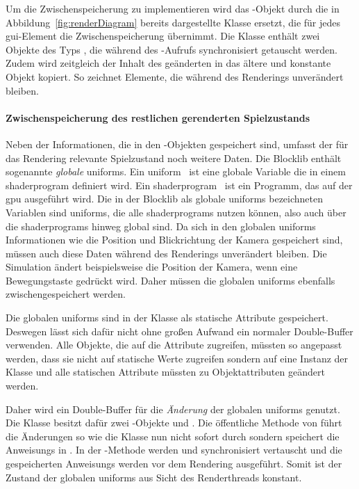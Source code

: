 Um die Zwischenspeicherung zu implementieren wird das -Objekt durch die in Abbildung~\vref{fig:renderDiagram} bereits dargestellte Klasse  ersetzt, die für jedes \ac{gui}-Element die Zwischenspeicherung übernimmt. Die Klasse enthält zwei Objekte des Typs , die während des -Aufrufs synchronisiert getauscht werden. Zudem wird zeitgleich der Inhalt des geänderten  in das ältere und konstante Objekt kopiert. So zeichnet  Elemente, die während des Renderings unverändert bleiben.


\paragraph{Zwischenspeicherung des restlichen gerenderten Spielzustands} Neben der Informationen, die in den  -Objekten gespeichert sind, umfasst der für das Rendering relevante Spielzustand noch weitere Daten. 
Die Blocklib enthält sogenannte \emph{globale} \glspl{uniform}. Ein \gls{uniform}~\cite[S.~45~ff.]{Vries2020} ist eine globale Variable die in einem \gls{shaderprogram} definiert wird. Ein \gls{shaderprogram}~\cite[S.~32~f.]{Vries2020} ist ein \gls{Programm}, das auf der \ac{gpu} ausgeführt wird. Die in der Blocklib als globale \glspl{uniform} bezeichneten Variablen sind \glspl{uniform}, die alle \glspl{shaderprogram} nutzen können, also auch über die \glspl{shaderprogram} hinweg global sind. Da sich in den globalen \glspl{uniform} Informationen wie die Position und Blickrichtung der Kamera gespeichert sind, müssen auch diese Daten während des Renderings unverändert bleiben. Die Simulation ändert beispielsweise die Position der Kamera, wenn eine Bewegungstaste gedrückt wird. Daher müssen die globalen \glspl{uniform} ebenfalls zwischengespeichert werden.

Die globalen \glspl{uniform} sind in der Klasse  als statische Attribute gespeichert. Deswegen lässt sich dafür nicht ohne großen Aufwand ein normaler Double-Buffer verwenden. Alle Objekte, die auf die Attribute zugreifen, müssten so angepasst werden, dass sie nicht auf statische Werte zugreifen sondern auf eine Instanz der Klasse und alle statischen Attribute müssten zu Objektattributen geändert werden.

Daher wird ein Double-Buffer für die \emph{Änderung} der globalen \glspl{uniform} genutzt. Die Klasse  besitzt dafür zwei -Objekte  und . Die öffentliche Methode  von  führt die Änderungen so wie die Klasse  nun nicht sofort durch sondern speichert die \glspl{Anweisung} in . In der -Methode werden  und  synchronisiert vertauscht und die gespeicherten \glspl{Anweisung} werden vor dem Rendering ausgeführt. Somit ist der Zustand der globalen \glspl{uniform} aus Sicht des Renderthreads konstant.


